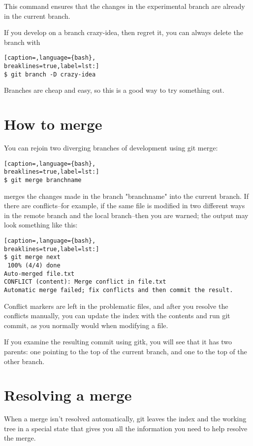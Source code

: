 This command ensures that the changes in the experimental branch are already in
the current branch.

If you develop on a branch crazy-idea, then regret it, you can always delete
the branch with

\lstset{basicstyle=\scriptsize, numbers=none, captionpos=b, tabsize=4}
\begin{lstlisting}[caption=,language={bash},
breaklines=true,label=lst:]
$ git branch -D crazy-idea
\end{lstlisting}

Branches are cheap and easy, so this is a good way to try something out.

\section{How to merge}
You can rejoin two diverging branches of development using git merge:

\lstset{basicstyle=\scriptsize, numbers=none, captionpos=b, tabsize=4}
\begin{lstlisting}[caption=,language={bash},
breaklines=true,label=lst:]
$ git merge branchname
\end{lstlisting}

merges the changes made in the branch "branchname" into the current branch. If
there are conflicts--for example, if the same file is modified in two different
ways in the remote branch and the local branch--then you are warned; the output
may look something like this:

\lstset{basicstyle=\scriptsize, numbers=none, captionpos=b, tabsize=4}
\begin{lstlisting}[caption=,language={bash},
breaklines=true,label=lst:]
$ git merge next
 100% (4/4) done
Auto-merged file.txt
CONFLICT (content): Merge conflict in file.txt
Automatic merge failed; fix conflicts and then commit the result.
\end{lstlisting}

Conflict markers are left in the problematic files, and after you resolve the
conflicts manually, you can update the index with the contents and run git
commit, as you normally would when modifying a file.

If you examine the resulting commit using gitk, you will see that it has two
parents: one pointing to the top of the current branch, and one to the top of
the other branch.

\section{Resolving a merge}
When a merge isn't resolved automatically, git leaves the index and the working
tree in a special state that gives you all the information you need to help
resolve the merge.

